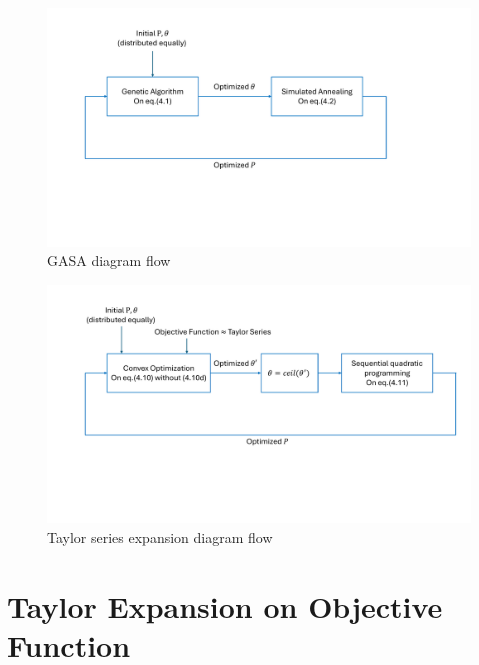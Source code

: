 \begin{figure}[h!]
    \centering
    \includegraphics[width=1\textwidth]{figure/GASA.pdf}
    \caption{GASA diagram flow}
    \label{GASA diagram flow}
\end{figure}

\begin{figure}[h!]
    \centering
    \includegraphics[width=1\textwidth]{figure/Taylor.pdf}
    \caption{Taylor series expansion diagram flow}
    \label{Taylor diagram flow}
\end{figure}

\section{Taylor Expansion on Objective Function}

